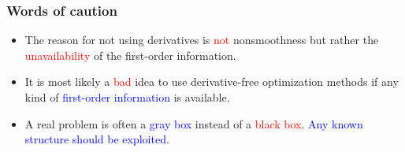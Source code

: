 \documentclass[slidestop,mathserif,xcolor=dvipsnames]{beamer}
\newcommand{\blue}[1]{\textcolor{blue}{#1}}
\newcommand{\red}[1]{\textcolor{red}{#1}}
\newcommand\etal{\textit{et al.}}
\begin{document}
\begin{frame}
   \frametitle{Words of caution}
   \vspace{2ex}
   \begin{itemize}
       \item The reason for not using derivatives is \red{not}
        nonsmoothness but rather the \red{unavailability} of the first-order
        information.
        \vspace{1ex}
    \item It is most likely a \red{bad} idea to use derivative-free optimization methods if
        {any kind of} \blue{first-order information} is available.
        \vspace{1ex}

    \item A real problem is often a \blue{gray box} instead of a \red{black box}.
        \blue{Any known structure should be exploited}.
        \vspace{1ex}



\end{itemize}
\end{frame}







\end{document}
